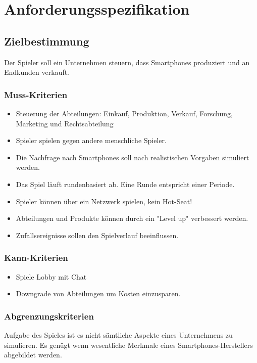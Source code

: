 
\chapter{Anforderungsspezifikation}

\section{Zielbestimmung}
Der Spieler soll ein Unternehmen steuern, dass Smartphones produziert und an Endkunden verkauft.
\subsection{Muss-Kriterien}
\begin{itemize}
\item Steuerung der Abteilungen: Einkauf, Produktion, Verkauf, Forschung, Marketing und Rechtsabteilung

\item Spieler spielen gegen andere menschliche Spieler.

\item Die Nachfrage nach Smartphones soll nach realistischen Vorgaben simuliert werden.

\item Das Spiel läuft rundenbasiert ab. Eine Runde entspricht einer Periode.

\item Spieler können über ein Netzwerk spielen, kein Hot-Seat!

\item Abteilungen und Produkte können durch ein "Level up" verbessert werden.
\item Zufallsereignisse sollen den Spielverlauf beeinflussen.
\end{itemize}

\subsection{Kann-Kriterien}

\begin{itemize}
\item  Spiele Lobby mit Chat
\item Downgrade von Abteilungen um Kosten einzusparen.
\end{itemize}

\subsection{Abgrenzungskriterien}
Aufgabe des Spieles ist es nicht sämtliche Aspekte eines Unternehmens zu simulieren. Es genügt wenn wesentliche Merkmale eines Smartphones-Herstellers abgebildet werden.


